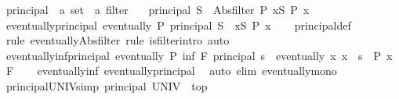 \begin{isabellebody}
\isamarkupfalse%
\ principal\ {\isacharcolon}{\kern0pt}{\isacharcolon}{\kern0pt}\ {\isachardoublequoteopen}{\isacharprime}{\kern0pt}a\ set\ {\isasymRightarrow}\ {\isacharprime}{\kern0pt}a\ filter{\isachardoublequoteclose}\ \isanewline
\ \ {\isachardoublequoteopen}principal\ S\ {\isacharequal}{\kern0pt}\ Abs{\isacharunderscore}{\kern0pt}filter\ {\isacharparenleft}{\kern0pt}{\isasymlambda}P{\isachardot}{\kern0pt}\ {\isasymforall}x{\isasymin}S{\isachardot}{\kern0pt}\ P\ x{\isacharparenright}{\kern0pt}{\isachardoublequoteclose}\isanewline
\isanewline
{}\isamarkupfalse%
\ eventually{\isacharunderscore}{\kern0pt}principal{\isacharcolon}{\kern0pt}\ {\isachardoublequoteopen}eventually\ P\ {\isacharparenleft}{\kern0pt}principal\ S{\isacharparenright}{\kern0pt}\ {\isasymlongleftrightarrow}\ {\isacharparenleft}{\kern0pt}{\isasymforall}x{\isasymin}S{\isachardot}{\kern0pt}\ P\ x{\isacharparenright}{\kern0pt}{\isachardoublequoteclose}\isanewline
%
\isadelimproof
\ \ %
\endisadelimproof
%
\isatagproof
{}\isamarkupfalse%
\ principal{\isacharunderscore}{\kern0pt}def\isanewline
\ \ \isamarkupfalse%
\ {\isacharparenleft}{\kern0pt}rule\ eventually{\isacharunderscore}{\kern0pt}Abs{\isacharunderscore}{\kern0pt}filter{\isacharcomma}{\kern0pt}\ rule\ is{\isacharunderscore}{\kern0pt}filter{\isachardot}{\kern0pt}intro{\isacharparenright}{\kern0pt}\ auto%
\endisatagproof
{\isafoldproof}%
%
\isadelimproof
\isanewline
%
\endisadelimproof
\isanewline
{}\isamarkupfalse%
\ eventually{\isacharunderscore}{\kern0pt}inf{\isacharunderscore}{\kern0pt}principal{\isacharcolon}{\kern0pt}\ {\isachardoublequoteopen}eventually\ P\ {\isacharparenleft}{\kern0pt}inf\ F\ {\isacharparenleft}{\kern0pt}principal\ s{\isacharparenright}{\kern0pt}{\isacharparenright}{\kern0pt}\ {\isasymlongleftrightarrow}\ eventually\ {\isacharparenleft}{\kern0pt}{\isasymlambda}x{\isachardot}{\kern0pt}\ x\ {\isasymin}\ s\ {\isasymlongrightarrow}\ P\ x{\isacharparenright}{\kern0pt}\ F{\isachardoublequoteclose}\isanewline
%
\isadelimproof
\ \ %
\endisadelimproof
%
\isatagproof
{}\isamarkupfalse%
\ eventually{\isacharunderscore}{\kern0pt}inf\ eventually{\isacharunderscore}{\kern0pt}principal\ \isamarkupfalse%
\ {\isacharparenleft}{\kern0pt}auto\ elim{\isacharcolon}{\kern0pt}\ eventually{\isacharunderscore}{\kern0pt}mono{\isacharparenright}{\kern0pt}%
\endisatagproof
{\isafoldproof}%
%
\isadelimproof
\isanewline
%
\endisadelimproof
\isanewline
{}\isamarkupfalse%
\ principal{\isacharunderscore}{\kern0pt}UNIV{\isacharbrackleft}{\kern0pt}simp{\isacharbrackright}{\kern0pt}{\isacharcolon}{\kern0pt}\ {\isachardoublequoteopen}principal\ UNIV\ {\isacharequal}{\kern0pt}\ top{\isachardoublequoteclose}\isanewline

\end{isabellebody}
